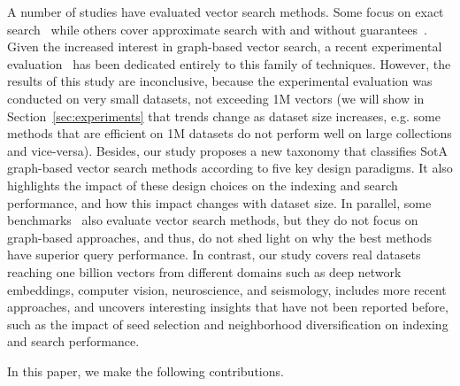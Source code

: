 

A number of studies have evaluated vector search methods. Some focus on exact search~\cite{hydra1} while others cover approximate search with and without guarantees~\cite{journal/tkde/li19, conf/sisap/martin17, journal/pvld/naidan2015}. 
Given the increased interest in graph-based vector search, a recent experimental evaluation~\cite{graph-survey-vldb} has been dedicated entirely to this family of techniques. However, the results of this study are inconclusive, because the experimental evaluation was conducted on very small datasets, not exceeding 1M vectors (we will show in Section~\ref{sec:experiments} that trends change as dataset size increases, e.g. some methods that are efficient on 1M datasets do not perform well on large collections and vice-versa).  
Besides, our study proposes a new taxonomy that classifies SotA graph-based vector search methods according to five key design paradigms. It also highlights the impact of these design choices on the indexing and search performance, and how this impact changes with dataset size. 
In parallel, some benchmarks~\cite{aumuller2017ann,neurips-2021-ann-competition} also evaluate vector search methods, but they do not focus on graph-based approaches, and thus, do not shed light on why the best methods have superior query performance. In contrast, our study covers real datasets reaching one billion vectors from different domains such as deep network embeddings, computer vision, neuroscience, and seismology, includes more recent approaches, and uncovers interesting insights that have not been reported before, such as the impact of seed selection and neighborhood diversification on indexing and search performance. 

In this paper, we make the following contributions.

